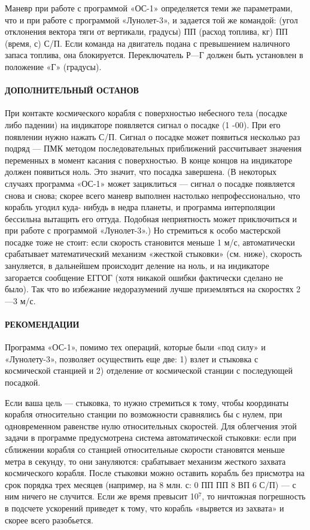 \documentclass[11pt,a4paper,oneside]{article}
\begin{document}
Маневр при работе с программой «ОС-1» определяется теми же параметрами, что и при работе с программой «Лунолет-3», и задается той же командой: (угол отклонения вектора тяги от вертикали, градусы) ПП (расход топлива, кг) ПП (время, с) С/П. Если команда на двигатель подана с превышением наличного запаса топлива, она блокируется. Переключатель Р—Г должен быть установлен в положение «Г» (градусы).

\paragraph{ДОПОЛНИТЕЛЬНЫЙ ОСТАНОВ}
При контакте космического корабля с поверхностью небесного тела (посадке либо падении) на индикаторе появляется сигнал о посадке (1 -00). При его появлении нужно нажать С/П. Сигнал о посадке может появиться несколько раз подряд — ПМК методом последовательных приближений рассчитывает значения переменных в момент касания с поверхностью. В конце концов на индикаторе должен появиться ноль. Это значит, что посадка завершена. (В некоторых случаях программа «ОС-1» может зациклиться — сигнал о посадке появляется снова и снова; скорее всего маневр выполнен настолько непрофессионально, что корабль угодил куда- нибудь в недра планеты, и программа интерполяции бессильна вытащить его оттуда. Подобная неприятность может приключиться и при работе с программой «Лунолет-3».) Но стремиться к особо мастерской посадке тоже не стоит: если скорость становится меньше 1 м/с, автоматически срабатывает математический механизм «жесткой стыковки» (см. ниже), скорость зануляется, в дальнейшем происходит деление на ноль, и на индикаторе загорается сообщение ЕГГОГ (хотя никакой ошибки фактически сделано не было). Так что во избежание недоразумений лучше приземляться на скоростях 2—3 м/с.

\paragraph{РЕКОМЕНДАЦИИ}
Программа «ОС-1», помимо тех операций, которые были «под силу» и «Лунолету-3», позволяет осуществить еще две: 1) взлет и стыковка с космической станцией и 2) отделение от космической станции с последующей посадкой.

Если ваша цель — стыковка, то нужно стремиться к тому, чтобы координаты корабля относительно станции по возможности сравнялись бы с нулем, при одновременном равенстве нулю относительных скоростей. Для облегчения этой задачи в программе предусмотрена система автоматической стыковки: если при сближении корабля со станцией относительные скорости становятся меньше метра в секунду, то они зануляются: срабатывает механизм жесткого захвата космического корабля. После стыковки можно оставить корабль без присмотра на срок порядка трех месяцев (например, на 8 млн. с: 0 ПП ПП 8 ВП 6 С/П) — с ним ничего не случится. Если же время превысит 10$^{7}$, то ничтожная погрешность в подсчете ускорений приведет к тому, что корабль «вырвется из захвата» и скорее всего разобьется.
\end{document}
